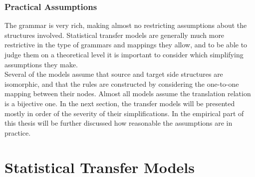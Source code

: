\documentclass[a4paper, 11pt]{report}
\theoremstyle{definition}
\theoremstyle{plain}
\begin{document}
\subsubsection{Practical Assumptions}

The \cite{rosetta1994compositional} grammar is very rich, making almost no restricting assumptions about the structures involved. Statistical transfer models are generally much more restrictive in the type of grammars and mappings they allow, and to be able to judge them on a theoretical level it is important to consider which simplifying assumptions they make.\\
Several of the models assume that source and target side structures are isomorphic, and that the rules are constructed by considering the one-to-one mapping between their nodes. Almost all models assume the translation relation is a bijective one. In the next section, the transfer models will be presented mostly in order of the severity of their simplifications. In the empirical part of this thesis will be further discussed how reasonable the assumptions are in practice.


\section{Statistical Transfer Models}
\label{sec:main}
\end{document}
